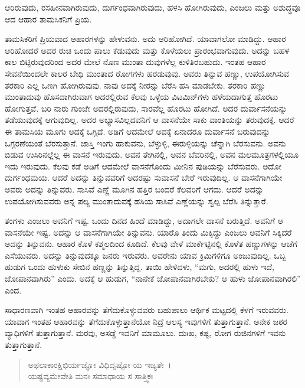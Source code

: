 {\small ಆರಿರುವುದು, ರಸಹೀನವಾಗಿರುವುದು, ದುರ್ಗಂಧವಾಗಿರುವುದು, ಹಳಸಿ ಹೋಗಿರುವುದು, ಎಂಜಲು ಮತ್ತು ಅಶುದ್ಧವೂ ಆದ ಆಹಾರ ತಾಮಸಿಕನಿಗೆ ಪ್ರಿಯ.}

ತಾಮಸಿಕರಿಗೆ ಪ್ರಿಯವಾದ ಆಹಾರಗಳನ್ನು ಹೇಳುವನು. ಅದು ಆರಿಹೋಗಿದೆ. ಯಾವಾಗಲೋ ಮಾಡಿದ್ದು. ಆಹಾರ ಆರಿಹೋದರೆ ಅದರ ರುಚಿ ಒಂದು ಪಾಲು ಕೆಡುವುದು ಮತ್ತು ಕೊಳೆಯಲು ಪ್ರಾರಂಭವಾಗುವುದು. ಅದನ್ನು ಬಹಳ ಕಾಲ ಬಿಟ್ಟಿರುವುದರಿಂದ ಅದರ ಮೇಲೆ ನೊಣ ಮುಂತಾ ದುವುಗಳೆಲ್ಲ ಕುಳಿತಿರಬಹುದು. ಇಂತಹ ಆಹಾರ ಸೇವನೆಯಿಂದಲೇ ಕಾಲರ ಬೇಧಿ ಮುಂತಾದ ರೋಗಗಳು ಹರಡುವುವು. ಅವರು ತಿನ್ನುವ ಹಣ್ಣು, ಉಪಯೋಗಿಸುವ ತರಕಾರಿ ಎಲ್ಲ ಒಣಗಿ ಹೋಗಿರುವುವು. ನಾವು ಅದಕ್ಕೆ ನೀರನ್ನು ಬೆರೆಸಿ ಹಸಿ ಮಾಡಬೇಕು. ತರಕಾರಿ ಹಣ್ಣು ಮುಂತಾದುವು ಹೊಸದಾಗಿರುವಾಗ ಅದರಲ್ಲಿರುವ ಕೆಲವು ಒಳ್ಳೆಯ ವಿಟಮಿನ್​ಗಳು ಹಳೆಯದಾಗುತ್ತ ಹೊರಟು ಹೋಗುತ್ತವೆ. ಬರಿ ನಾರು ಗುಂಜೇ ಅದರಲ್ಲಿರುವುದು, ಸಾರವೆಲ್ಲ ಹೊರಟು ಹೋಗಿದೆ. ಅದರ ದುರ್ವಾಸನೆಯನ್ನು ತಡೆಯುವುದಕ್ಕೆ ಆಗುವುದಿಲ್ಲ. ಅದರ ಅಭ್ಯಾಸವಿಲ್ಲದವನಿಗೆ ಆ ವಾಸನೆಯೇ ಸಾಕು ವಾಂತಿಯನ್ನು ತರುವುದಕ್ಕೆ. ಆದರೆ ಈ ತಾಮಸಿಯ ಮೂಗು ಅದಕ್ಕೆ ಒಗ್ಗಿದೆ. ಅಡಿಗೆ ಆದಮೇಲೆ ಅದಕ್ಕೆ ಏನಾದರೂ ದುರ್ವಾಸನೆ ಬರುವುದನ್ನು ಒಗ್ಗರಣೆಯಂತೆ ಬೆರಸುತ್ತಾನೆ. ಜಾಸ್ತಿ ಇಂಗು ಹಾಕುವನು, ಬೆಳ್ಳುಳ್ಳಿ, ಈರುಳ್ಳಿಯನ್ನು ಚೆನ್ನಾಗಿ ಬೆರಸುವನು. ಅವನು ಬಿಡುವ ಉಸಿರಿನಲ್ಲೆಲ್ಲ ಈ ವಾಸನೆ ಇರುವುದು. ಅವನ ತೇಗಿನಲ್ಲಿ, ಅವನ ಬೆವರಿನಲ್ಲಿ, ಅವನ ಮಲಮೂತ್ರಗಳಲ್ಲಿಯೂ ಇದು ಇರುವುದು. ಕೆಲವು ಕಡೆ ಅಡಿಗೆ ಆದಮೇಲೆ ವಾಸನೆಗೊಂದು ಮೀನಿನ ಪುಡಿಯನ್ನು ಬೆರೆಸುವರು. ಅದೋ ದುರ್ಗಂಧಮಯ. ಆದರೆ ಅದನ್ನು ತಿನ್ನುವವರಿಗೆ ಅದರಷ್ಟು ಸುವಾಸನೆ ಬೇರೆ ಇರುವುದಿಲ್ಲ. ಆ ವಾಸನೆಗಾಗಿಯೇ ಅವರು ಅದನ್ನು ತಿನ್ನುವರು. ಸಾಸಿವೆ ಎಣ್ಣೆ ಮೂಗಿನ ಹತ್ತಿರ ಬಂದರೆ ಕೆಲವರಿಗೆ ಆಗದು. ಆದರೆ ಅದನ್ನು ಉಪಯೋಗಿಸುವವರು ಅನ್ನ ಪಲ್ಯ ಮುಂತಾದುವಕ್ಕೆ ಹಸಿಯ ಸಾಸಿವೆ ಎಣ್ಣೆಯನ್ನು ಸ್ವಲ್ಪ ಬೆರೆಸಿ ತಿನ್ನುತ್ತಾರೆ.

ತಂಗಳು ಎಂಜಲು ಅವನಿಗೆ ಇಷ್ಟ. ಒಂದು ದಿನದ ಹಿಂದೆ ಮಾಡಿದ್ದು, ಅದಾಗಲೇ ವಾಸನೆ ಬರುತ್ತಿದೆ. ಅವನಿಗೆ ಆ ವಾಸನೆಯೇ ಇಷ್ಟ. ಅದನ್ನು ಆ ವಾಸನೆಗಾಗಿಯೇ ತಿನ್ನುವನು. ಯಾರೊ ತಿಂದು ಮಿಕ್ಕಿದ್ದು ಎಂಜಲು ಅವನಿಗೆ ಸಿಕ್ಕಿದರೆ ಅದನ್ನು ತಿನ್ನುವನು. ಆಹಾರ ಕೊಳೆ ಕಶ್ಮಲದಿಂದ ಕೂಡಿದೆ. ಕೆಲವು ವೇಳೆ ಮಾರ್ಕೆಟ್ಟಿನಲ್ಲಿ ಕೊಳೆತ ಹಣ್ಣುಗಳನ್ನು ಆಚೆಗೆ ಎಸೆಯುವರು. ಅದನ್ನು ತಿನ್ನುವುದಕ್ಕೂ ಜನರು ಇರುವರು. ಅವರೇನು ಯಾವ ಕ್ರಿಮಿಗಳಿಗೂ ಅಂಜುವುದಿಲ್ಲ. ಒಬ್ಬ ಹುಡುಗ ಒಂದು ಹುಳುಕು ಸೇಬಿನ ಹಣ್ಣನ್ನು ತಿನ್ನುತ್ತಿದ್ದ. ತಾಯಿ ಹೇಳಿದಳು, “ಮಗು, ಅದರಲ್ಲಿ ಹುಳು ಇದೆ, ಜೋಪಾನವಾಗಿರು” ಎಂದು. ಅದಕ್ಕೆ ಆ ಹುಡುಗ, “ನಾನೇಕೆ ಜೋಪಾನವಾಗಿರಬೇಕು? ಆ ಹುಳು ಜೋಪಾನವಾಗಿರಲಿ” ಎಂದ.

ಸಾಧಾರಣವಾಗಿ ಇಂತಹ ಆಹಾರವನ್ನು ತೆಗೆದುಕೊಳ್ಳುವವರು ಬಹುಪಾಲು ಆರ್ಥಿಕ ಮಟ್ಟದಲ್ಲಿ ಕೆಳಗೆ ಇರುವವರು. ಯಾವಾಗ ಇಂತಹ ಆಹಾರವನ್ನು ತೆಗೆದುಕೊಳ್ಳುತ್ತಾನೆಯೋ ನಿದ್ರೆ ಆಲಸ್ಯ ಇವುಗಳಿಗೆ ತುತ್ತಾಗುತ್ತಾನೆ. ಅನೇಕ ಜಠರ ವ್ಯಾಧಿಗಳಿಗೆ ತುತ್ತಾಗುತ್ತಾನೆ. ಮರವು, ಅಸಡ್ಡೆ ಇವನಿಗೆ ಮಾಮೂಲು. ದುಃಖ, ಕಷ್ಟ, ರೋಗ ರುಜಿನಗಳಿಗೆ ಇವನು ತುತ್ತಾಗುತ್ತಾನೆ.

\begin{verse}
ಅಫಲಾಕಾಂಕ್ಷಿಭಿರ್ಯಜ್ಞೋ ವಿಧಿದೃಷ್ಟೋ ಯ ಇಜ್ಯತೇ~।\\ಯಷ್ಟವ್ಯಮೇವೇತಿ ಮನಃ ಸಮಾಧಾಯ ಸ ಸಾತ್ತ್ವಿಕಃ 
\end{verse}

